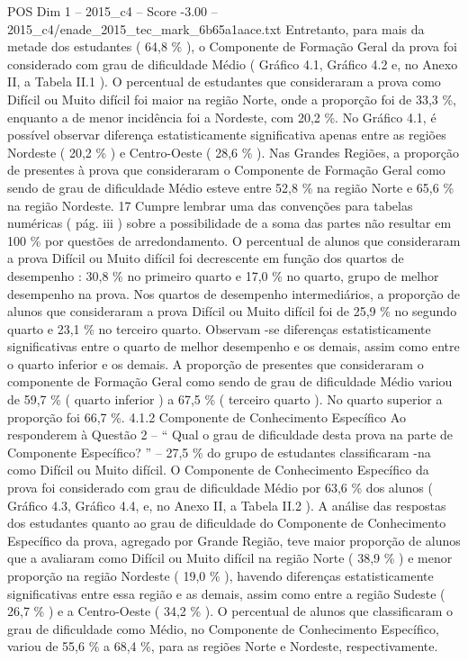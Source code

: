\begin{textsample}{POS Dim 1 – 2015\_c4 – Score -3.00 – 2015\_c4/enade\_2015\_tec\_mark\_6b65a1aace.txt}
Entretanto, para mais da metade dos estudantes ( 64,8 \% ), o Componente de Formação Geral da prova foi considerado com grau de dificuldade Médio ( Gráfico 4.1, Gráfico 4.2 e, no Anexo II, a Tabela II.1 ).
O percentual de estudantes que consideraram a prova como Difícil ou Muito difícil foi maior na região Norte, onde a proporção foi de 33,3 \%, enquanto a de menor incidência foi a Nordeste, com 20,2 \%.
No Gráfico 4.1, é possível observar diferença estatisticamente significativa apenas entre as regiões Nordeste ( 20,2 \% ) e Centro-Oeste ( 28,6 \% ).
Nas Grandes Regiões, a proporção de presentes à prova que consideraram o Componente de Formação Geral como sendo de grau de dificuldade Médio esteve entre 52,8 \% na região Norte e 65,6 \% na região Nordeste. 17 Cumpre lembrar uma das convenções para tabelas numéricas ( pág. iii ) sobre a possibilidade de a soma das partes não resultar em 100 \% por questões de arredondamento.
O percentual de alunos que consideraram a prova Difícil ou Muito difícil foi decrescente em função dos quartos de desempenho : 30,8 \% no primeiro quarto e 17,0 \% no quarto, grupo de melhor desempenho na prova.
Nos quartos de desempenho intermediários, a proporção de alunos que consideraram a prova Difícil ou Muito difícil foi de 25,9 \% no segundo quarto e 23,1 \% no terceiro quarto.
Observam -se diferenças estatisticamente significativas entre o quarto de melhor desempenho e os demais, assim como entre o quarto inferior e os demais.
A proporção de presentes que consideraram o componente de Formação Geral como sendo de grau de dificuldade Médio variou de 59,7 \% ( quarto inferior ) a 67,5 \% ( terceiro quarto ).
No quarto superior a proporção foi 66,7 \%. 4.1.2 Componente de Conhecimento Específico Ao responderem à Questão 2 – “ Qual o grau de dificuldade desta prova na parte de Componente Específico? ” – 27,5 \% do grupo de estudantes classificaram -na como Difícil ou Muito difícil.
O Componente de Conhecimento Específico da prova foi considerado com grau de dificuldade Médio por 63,6 \% dos alunos ( Gráfico 4.3, Gráfico 4.4, e, no Anexo II, a Tabela II.2 ).
A análise das respostas dos estudantes quanto ao grau de dificuldade do Componente de Conhecimento Específico da prova, agregado por Grande Região, teve maior proporção de alunos que a avaliaram como Difícil ou Muito difícil na região Norte ( 38,9 \% ) e menor proporção na região Nordeste ( 19,0 \% ), havendo diferenças estatisticamente significativas entre essa região e as demais, assim como entre a região Sudeste ( 26,7 \% ) e a Centro-Oeste ( 34,2 \% ).
O percentual de alunos que classificaram o grau de dificuldade como Médio, no Componente de Conhecimento Específico, variou de 55,6 \% a 68,4 \%, para as regiões Norte e Nordeste, respectivamente.

\end{textsample}
